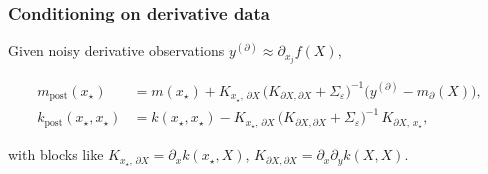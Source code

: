 \documentclass[
  letterpaper,
  DIV=11,
  numbers=noendperiod]{scrartcl}
\begin{document}
\subsubsection{Conditioning on derivative
data}\label{conditioning-on-derivative-data}

Given noisy derivative observations
\(y^{(\partial)} \approx \partial_{x_j} f(X)\),

\[
\begin{aligned}
m_{\text{post}}(x_\star)
&= m(x_\star) + K_{x_\star,\,\partial X}\,\big(K_{\partial X,\partial X}+\Sigma_\varepsilon\big)^{-1}\!\big(y^{(\partial)} - m_{\partial}(X)\big),\\[4pt]
k_{\text{post}}(x_\star,x_\star)
&= k(x_\star,x_\star) - K_{x_\star,\,\partial X}\,\big(K_{\partial X,\partial X}+\Sigma_\varepsilon\big)^{-1}\,K_{\partial X,\,x_\star},
\end{aligned}
\]

with blocks like
\(K_{x_\star,\,\partial X} = \partial_{x} k(x_\star, X)\),
\(K_{\partial X,\partial X}=\partial_x\partial_y k(X,X)\).
\end{document}
